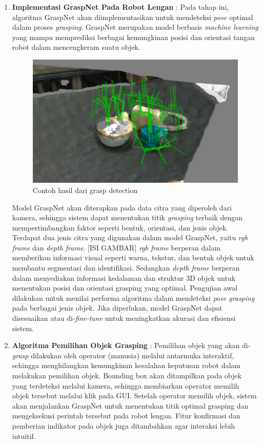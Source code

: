 \begin{enumerate}
  \item \textbf{Implementasi GraspNet Pada Robot Lengan} : Pada tahap ini, algoritma GraspNet
  akan diimplementasikan untuk mendeteksi \emph{pose} optimal dalam proses \emph{grasping}.
  GraspNet merupakan model berbasis \emph{machine learning} yang mampu memprediksi berbagai
  kemungkinan posisi dan orientasi tangan robot dalam mencengkeram suatu objek.
  \begin{figure} [H] \centering
    \includegraphics[scale=0.15]{gambar/contoh_hasil_graspdetect.png}
    \caption{Contoh hasil dari grasp detection\parencite{img_result_graspdetect}}
    \label{fig:graspdetect result}
  \end{figure}
  Model GraspNet akan diterapkan pada data citra yang diperoleh dari kamera, sehingga sistem dapat menentukan
  titik \emph{grasping} terbaik dengan mempertimbangkan faktor seperti bentuk, orientasi, dan jenis objek.
  Terdapat dua jenis citra yang digunakan dalam model GraspNet, yaitu \emph{rgb frame} dan \emph{depth frame}.
  [ISI GAMBAR]
  \emph{rgb frame} berperan dalam memberikan informasi visual seperti warna, tekstur, dan bentuk objek
  untuk membantu segmentasi dan identifikasi. Sedangkan \emph{depth frame} berperan dalam menyediakan
  informasi kedalaman dan struktur 3D objek untuk menentukan posisi dan orientasi grasping yang optimal.
  Pengujian awal dilakukan untuk menilai performa algoritma dalam mendeteksi \emph{pose} \emph{grasping}
  pada berbagai jenis objek. Jika diperlukan, model GraspNet dapat disesuaikan atau
  di-\emph{fine-tune} untuk meningkatkan akurasi dan efisiensi sistem.

  \item \textbf{Algoritma Pemilihan Objek Grasping} : Pemilihan objek yang akan di-\emph{grasp} dilakukan
  oleh operator (manusia) melalui antarmuka interaktif, sehingga menghilangkan kemungkinan kesalahan
  keputusan robot dalam melakukan pemilihan objek. Bounding box akan ditampilkan pada objek yang terdeteksi
  melalui kamera, sehingga membiarkan operator memilih objek tersebut melalui klik pada GUI. Setelah operator
  memilih objek, sistem akan menjalankan GraspNet untuk menentukan titik optimal grasping dan
  mengeksekusi perintah tersebut pada robot lengan. Fitur konfirmasi dan pemberian indikator pada objek
  juga ditambahkan agar interaksi lebih intuitif.


\end{enumerate}
